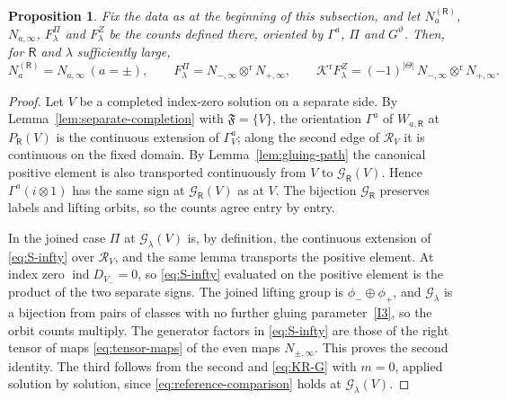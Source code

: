 \documentclass[11pt]{amsart}
\newtheorem{proposition}[theorem]{Proposition}
\theoremstyle{definition}
\theoremstyle{remark}
\theoremstyle{plain}
\numberwithin{equation}{section}
\newcommand{\ind}{\operatorname{ind}}
\begin{document}
\begin{proposition}\label{prop:large-length-counts}
Fix the data as at the beginning of this subsection, and let
$N^{(\mathsf R)}_a$, $N_{a,\infty}$, $F^\Pi_\lambda$ and $F^Z_\lambda$ be the
counts defined there, oriented by $\Gamma^a$, $\Pi$ and $G^{\vartheta}$. Then,
for $\mathsf R$ and $\lambda$ sufficiently large,
\[
 N^{(\mathsf R)}_a=N_{a,\infty}\ (a=\pm),\qquad
 F^\Pi_\lambda=N_{-,\infty}\otimes^{\mathrm r}N_{+,\infty},\qquad
 \mathcal K^{\mathrm r}F^Z_\lambda=(-1)^{|\Theta|}\,N_{-,\infty}\otimes^{\mathrm r}N_{+,\infty}.
\]
\end{proposition}
\begin{proof}
Let $V$ be a completed index-zero solution on a separate side. By
Lemma~\ref{lem:separate-completion} with $\mathfrak F=\{V\}$, the
orientation $\Gamma^a$ of $W_{a,\mathsf R}$ at $P_{\mathsf R}(V)$ is the
continuous extension of $\Gamma^a_V$; along the second edge of
$\mathcal R_V$ it is continuous on the fixed domain. By
Lemma~\ref{lem:gluing-path} the canonical positive element is also
transported continuously from $V$ to $\mathcal G_{\mathsf R}(V)$. Hence $\Gamma^a(i\otimes1)$ has the
same sign at $\mathcal G_{\mathsf R}(V)$ as at $V$. The bijection
$\mathcal G_{\mathsf R}$ preserves labels and lifting orbits, so the
counts agree entry by entry.

In the joined case $\Pi$ at $\mathcal G_\lambda(V)$ is, by definition, the
continuous extension of \eqref{eq:S-infty} over $\mathcal R_V$, and the
same lemma transports the positive element. At index zero
$\ind D_{V_-}=0$, so \eqref{eq:S-infty} evaluated on the positive
element is the product of the two separate signs. The joined lifting
group is $\phi_-\oplus\phi_+$, and $\mathcal G_\lambda$ is a bijection
from pairs of classes with no further gluing parameter~\ref{I3}, so the
orbit counts multiply. The generator
factors in \eqref{eq:S-infty} are those of the right tensor of maps
\eqref{eq:tensor-maps} of the even maps $N_{\pm,\infty}$. This proves
the second identity. The third follows from the second and
\eqref{eq:KR-G} with $m=0$, applied solution by solution, since
\eqref{eq:reference-comparison} holds at $\mathcal G_\lambda(V)$.
\end{proof}
\end{document}
